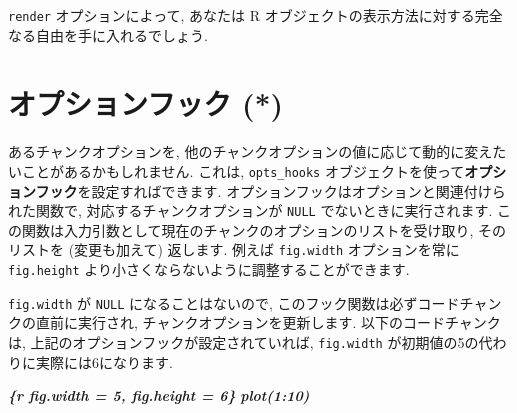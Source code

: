 \documentclass[
  11pt,
  lualatex,ja=standard,jafont=noto]{bxjsreport}
\newenvironment{Shaded}{\begin{snugshade}}{\end{snugshade}}
\newcommand{\AttributeTok}[1]{\textcolor[rgb]{0.77,0.63,0.00}{#1}}
\newcommand{\ControlFlowTok}[1]{\textcolor[rgb]{0.13,0.29,0.53}{\textbf{#1}}}
\newcommand{\FunctionTok}[1]{\textcolor[rgb]{0.00,0.00,0.00}{#1}}
\newcommand{\InformationTok}[1]{\textcolor[rgb]{0.56,0.35,0.01}{\textbf{\textit{#1}}}}
\newcommand{\NormalTok}[1]{#1}
\newcommand{\OtherTok}[1]{\textcolor[rgb]{0.56,0.35,0.01}{#1}}
\newcommand{\SpecialCharTok}[1]{\textcolor[rgb]{0.00,0.00,0.00}{#1}}
\begin{document}
\texttt{render} オプションによって, あなたは R オブジェクトの表示方法に対する完全なる自由を手に入れるでしょう.

\hypertarget{option-hooks}{%
\section{オプションフック (*)}\label{option-hooks}}

あるチャンクオプションを, 他のチャンクオプションの値に応じて動的に変えたいことがあるかもしれません. これは, \texttt{opts\_hooks} オブジェクトを使って\textbf{オプションフック}を設定すればできます. オプションフックはオプションと関連付けられた関数で, 対応するチャンクオプションが \texttt{NULL} でないときに実行されます. この関数は入力引数として現在のチャンクのオプションのリストを受け取り, そのリストを (変更も加えて) 返します. 例えば \texttt{fig.width} オプションを常に \texttt{fig.height} より小さくならないように調整することができます.

\begin{Shaded}
\end{Shaded}

\texttt{fig.width} が \texttt{NULL} になることはないので, このフック関数は必ずコードチャンクの直前に実行され, チャンクオプションを更新します. 以下のコードチャンクは, 上記のオプションフックが設定されていれば, \texttt{fig.width} が初期値の5の代わりに実際には6になります.

\begin{Shaded}
\begin{Highlighting}[]
\InformationTok{\textasciigrave{}\textasciigrave{}\textasciigrave{}\{r fig.width = 5, fig.height = 6\}}
\InformationTok{plot(1:10)}
\InformationTok{\textasciigrave{}\textasciigrave{}\textasciigrave{}}
\end{Highlighting}
\end{Shaded}
\end{document}
